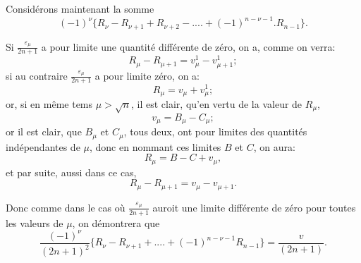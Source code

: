 \documentclass{article}
\begin{document}
Considérons maintenant la somme
\[ (-1)^{\nu}\{R_{\nu}-R_{\nu+1}+R_{\nu+2}-....+(-1)^{n-\nu-1}.R_{n-1}\}. \]

Si $\frac{\varepsilon_{\mu}}{2n+1}$ a pour limite une quantité différente de zéro, on a, comme on verra:
\[ R_{\mu}-R_{\mu+1}=v_{\mu}^{1}-v_{\mu+1}^{1}; \]
si au contraire $\frac{\varepsilon_{\mu}}{2n+1}$ a pour limite zéro, on a:
\[ R_{\mu}=v_{\mu}+v_{\mu}^{1}; \]
or, si en même tems $\mu>\sqrt{n}$, il est clair, qu'en vertu de la valeur de $R_{\mu}$,
\[ v_{\mu}=B_{\mu}-C_{\mu}; \]
or il est clair, que $B_{\mu}$ et $C_{\mu}$, tous deux, ont pour limites des quantités indépendantes de $\mu$, donc en nommant ces limites $B$ et $C$, on aura:
\[ R_{\mu}=B-C+v_{\mu}, \]
et par suite, aussi dans ce cas,
\[ R_{\mu}-R_{\mu+1}=v_{\mu}-v_{\mu+1}. \]

Donc comme dans le cas où $\frac{\varepsilon_{\mu}}{2n+1}$ auroit une limite différente de zéro pour toutes les valeurs de $\mu$, on démontrera que
\[ \frac{(-1)^{\nu}}{(2n+1)^{2}}\{R_{\nu}-R_{\nu+1}+....+(-1)^{n-\nu-1}R_{n-1}\}=\frac{v}{(2n+1)}. \]
\end{document}
